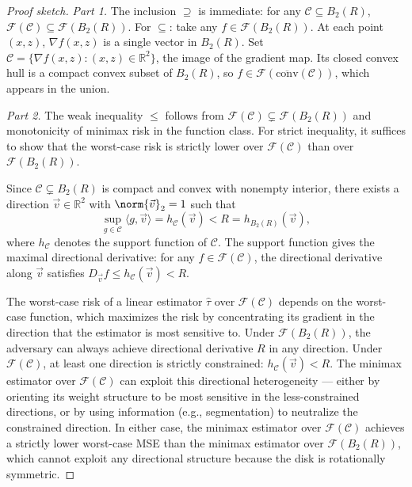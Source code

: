 \begin{proof}[Proof sketch]
	\emph{Part 1.}
	The inclusion $\supseteq$ is immediate: for any $\mathcal{C} \subseteq B_2(R)$, $\mathcal{F}(\mathcal{C}) \subseteq \mathcal{F}(B_2(R))$.
	For $\subseteq$: take any $f \in \mathcal{F}(B_2(R))$.
	At each point $(x,z)$, $\nabla f(x,z)$ is a single vector in $B_2(R)$.
	Set $\mathcal{C} = \{ \nabla f(x,z) : (x,z) \in \mathbb{R}^2 \}$, the image of the gradient map.
	Its closed convex hull is a compact convex subset of $B_2(R)$, so $f \in \mathcal{F}(\overline{\mathrm{conv}}(\mathcal{C}))$, which appears in the union.

	\emph{Part 2.}
	The weak inequality $\leq$ follows from $\mathcal{F}(\mathcal{C}) \subsetneq \mathcal{F}(B_2(R))$ and monotonicity of minimax risk in the function class.
	For strict inequality, it suffices to show that the worst-case risk is strictly lower over $\mathcal{F}(\mathcal{C})$ than over $\mathcal{F}(B_2(R))$.

	Since $\mathcal{C} \subsetneq B_2(R)$ is compact and convex with nonempty interior, there exists a direction $\vec{v} \in \mathbb{R}^2$ with $\norm{\vec{v}}_2 = 1$ such that
	\begin{equation*}
		\sup_{g \in \mathcal{C}} \langle g, \vec{v} \rangle = h_{\mathcal{C}}(\vec{v}) < R = h_{B_2(R)}(\vec{v}),
	\end{equation*}
	where $h_{\mathcal{C}}$ denotes the support function of $\mathcal{C}$.
	The support function gives the maximal directional derivative: for any $f \in \mathcal{F}(\mathcal{C})$, the directional derivative along $\vec{v}$ satisfies $D_{\vec{v}} f \leq h_{\mathcal{C}}(\vec{v}) < R$.

	The worst-case risk of a linear estimator $\hat\tau$ over $\mathcal{F}(\mathcal{C})$ depends on the worst-case function, which maximizes the risk by concentrating its gradient in the direction that the estimator is most sensitive to.
	Under $\mathcal{F}(B_2(R))$, the adversary can always achieve directional derivative $R$ in any direction.
	Under $\mathcal{F}(\mathcal{C})$, at least one direction is strictly constrained: $h_{\mathcal{C}}(\vec{v}) < R$.
	The minimax estimator over $\mathcal{F}(\mathcal{C})$ can exploit this directional heterogeneity --- either by orienting its weight structure to be most sensitive in the less-constrained directions, or by using information (e.g., segmentation) to neutralize the constrained direction.
	In either case, the minimax estimator over $\mathcal{F}(\mathcal{C})$ achieves a strictly lower worst-case MSE than the minimax estimator over $\mathcal{F}(B_2(R))$, which cannot exploit any directional structure because the disk is rotationally symmetric.
\end{proof}

